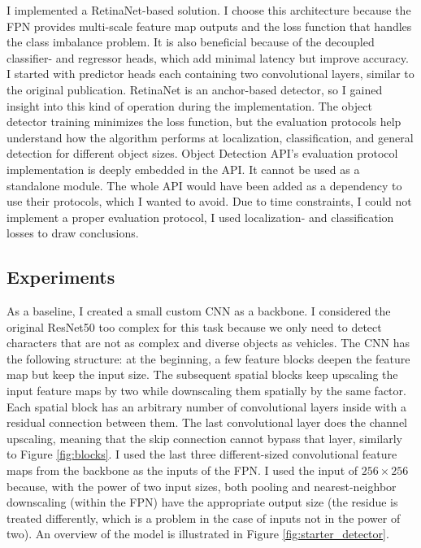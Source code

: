 I implemented a RetinaNet-based solution. I choose this architecture because the FPN provides multi-scale feature map outputs and the loss function that handles the class imbalance problem. It is also beneficial because of the decoupled classifier- and regressor heads, which add minimal latency but improve accuracy. I started with predictor heads each containing two convolutional layers, similar to the original publication. RetinaNet is an anchor-based detector, so I gained insight into this kind of operation during the implementation. The object detector training minimizes the loss function, but the evaluation protocols help understand how the algorithm performs at localization, classification, and general detection for different object sizes. Object Detection API's evaluation protocol implementation is deeply embedded in the API. It cannot be used as a standalone module. The whole API would have been added as a dependency to use their protocols, which I wanted to avoid. Due to time constraints, I could not implement a proper evaluation protocol, I used localization- and classification losses to draw conclusions.

\subsection{Experiments}

As a baseline, I created a small custom CNN as a backbone. I considered the original ResNet50 too complex for this task because we only need to detect characters that are not as complex and diverse objects as vehicles. The CNN has the following structure: at the beginning, a few feature blocks deepen the feature map but keep the input size. The subsequent spatial blocks keep upscaling the input feature maps by two while downscaling them spatially by the same factor. Each spatial block has an arbitrary number of convolutional layers inside with a residual connection between them. The last convolutional layer does the channel upscaling, meaning that the skip connection cannot bypass that layer, similarly to Figure \ref{fig:blocks}. I used the last three different-sized convolutional feature maps from the backbone as the inputs of the FPN. I used the input of $256\times256$ because, with the power of two input sizes, both pooling and nearest-neighbor downscaling (within the FPN) have the appropriate output size (the residue is treated differently, which is a problem in the case of inputs not in the power of two). An overview of the model is illustrated in Figure \ref{fig:starter_detector}.

